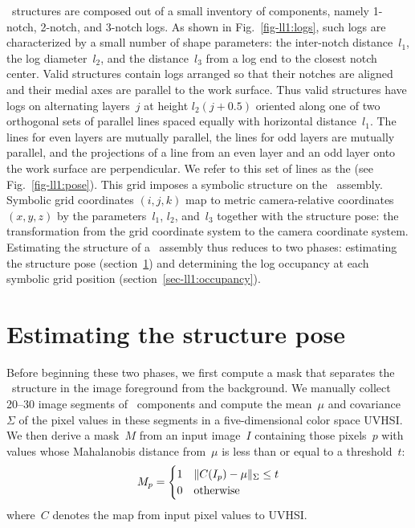 \LincolnLog\ structures are composed out of a small inventory of components,
namely 1-notch, 2-notch, and 3-notch logs.
%
As shown in Fig.~\ref{fig-ll1:logs}, such logs are characterized by a small number
of shape parameters: the inter-notch distance~$l_1$, the log diameter~$l_2$, and
the distance~$l_3$ from a log end to the closest notch center.
%
Valid structures contain logs arranged so that their notches are aligned and
their medial axes are parallel to the work surface.
%
Thus valid structures have logs on alternating layers~$j$ at
height $l_2(j+0.5)$ oriented along one of two orthogonal sets of parallel lines
spaced equally with horizontal distance~$l_1$.
%
The lines for even layers are mutually parallel, the lines for odd layers are
mutually parallel, and the projections of a line from an even layer and an odd
layer onto the work surface are perpendicular.
%
We refer to this set of lines as the  (see Fig.~\ref{fig-ll1:pose}).
%
This grid imposes a symbolic structure on the \LincolnLog\ assembly.
%
Symbolic grid coordinates $(i,j,k)$ map to metric camera-relative
coordinates $(x,y,z)$ by the parameters~$l_1$, $l_2$, and~$l_3$ together with
the structure pose: the transformation from the grid coordinate system to the
camera coordinate system.
%
Estimating the structure of a \LincolnLog\ assembly thus reduces to two phases:
estimating the structure pose (section~\ref{sec-ll1:pose}) and determining the
log occupancy at each symbolic grid position (section~\ref{sec-ll1:occupancy}).

\section{Estimating the structure pose}
\label{sec-ll1:pose}

Before beginning these two phases, we first compute a mask that separates the
\LincolnLog\ structure in the image foreground from the background.
%
We manually collect 20--30 image segments of \LincolnLog\ components and compute
the mean~$\mu$ and covariance~$\Sigma$ of the pixel values in these segments in
a five-dimensional color space UVHSI.\@
%
We then derive a mask~$M$ from an input image~$I$ containing those pixels~$p$
with values whose Mahalanobis distance from~$\mu$ is less than or equal to a
threshold~$t$:
%
\[M_p =
\begin{cases}
  1 & \lVert C(I_p) - \mu\rVert_{\Sigma}\leq t\\
  0 & \textrm{otherwise}\\
\end{cases}\]
%
where~$C$ denotes the map from input pixel values to UVHSI.\@

